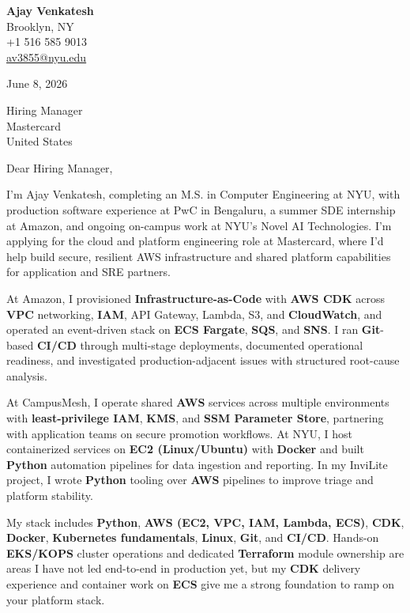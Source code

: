 \documentclass[letterpaper,11pt]{article}
\begin{document}
\begin{flushleft}
\textbf{\large Ajay Venkatesh} \\
Brooklyn, NY \\
+1 516 585 9013 \\
\href{mailto:av3855@nyu.edu}{av3855@nyu.edu}
\end{flushleft}
\vspace{10pt}
June 8, 2026
\vspace{6pt}

Hiring Manager \\
Mastercard \\
United States

\vspace{10pt}

Dear Hiring Manager,

I'm Ajay Venkatesh, completing an M.S. in Computer Engineering at NYU, with production software experience at PwC in Bengaluru, a summer SDE internship at Amazon, and ongoing on-campus work at NYU's Novel AI Technologies. I'm applying for the cloud and platform engineering role at Mastercard, where I'd help build secure, resilient AWS infrastructure and shared platform capabilities for application and SRE partners.

At Amazon, I provisioned \textbf{Infrastructure-as-Code} with \textbf{AWS CDK} across \textbf{VPC} networking, \textbf{IAM}, API Gateway, Lambda, S3, and \textbf{CloudWatch}, and operated an event-driven stack on \textbf{ECS Fargate}, \textbf{SQS}, and \textbf{SNS}. I ran \textbf{Git}-based \textbf{CI/CD} through multi-stage deployments, documented operational readiness, and investigated production-adjacent issues with structured root-cause analysis.

At CampusMesh, I operate shared \textbf{AWS} services across multiple environments with \textbf{least-privilege IAM}, \textbf{KMS}, and \textbf{SSM Parameter Store}, partnering with application teams on secure promotion workflows. At NYU, I host containerized services on \textbf{EC2 (Linux/Ubuntu)} with \textbf{Docker} and built \textbf{Python} automation pipelines for data ingestion and reporting. In my InviLite project, I wrote \textbf{Python} tooling over \textbf{AWS} pipelines to improve triage and platform stability.

My stack includes \textbf{Python}, \textbf{AWS (EC2, VPC, IAM, Lambda, ECS)}, \textbf{CDK}, \textbf{Docker}, \textbf{Kubernetes fundamentals}, \textbf{Linux}, \textbf{Git}, and \textbf{CI/CD}. Hands-on \textbf{EKS/KOPS} cluster operations and dedicated \textbf{Terraform} module ownership are areas I have not led end-to-end in production yet, but my \textbf{CDK} delivery experience and container work on \textbf{ECS} give me a strong foundation to ramp on your platform stack.
\end{document}
